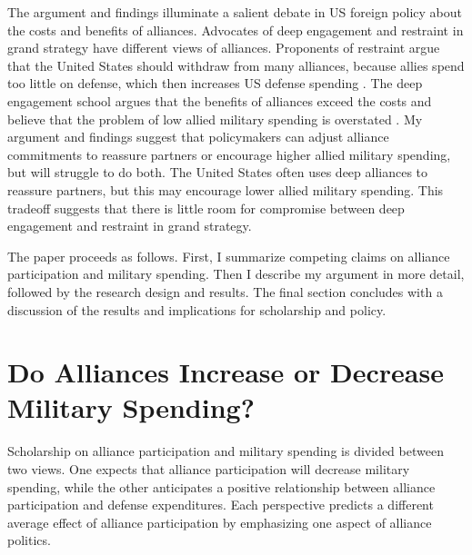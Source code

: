 \documentclass[12pt]{article}
\begin{document}
The argument and findings illuminate a salient debate in US foreign policy about the costs and benefits of alliances. 
Advocates of deep engagement \citep{Brooksetal2013} and restraint \citep{Posen2014} in grand strategy have different views of alliances. 
Proponents of restraint argue that the United States should withdraw from many alliances, because allies spend too little on defense, which then increases US defense spending \citep{Preble2009}.
The deep engagement school argues that the benefits of alliances exceed the costs and believe that the problem of low allied military spending is overstated \citep{BrandsFeaver2017}. 
My argument and findings suggest that policymakers can adjust alliance commitments to reassure partners or encourage higher allied military spending, but will struggle to do both. 
The United States often uses deep alliances to reassure partners, but this may encourage lower allied military spending. 
This tradeoff suggests that there is little room for compromise between deep engagement and restraint in grand strategy.  


The paper proceeds as follows. 
First, I summarize competing claims on alliance participation and military spending. 
Then I describe my argument in more detail, followed by the research design and results. 
The final section concludes with a discussion of the results and implications for scholarship and policy.  



\section{Do Alliances Increase or Decrease Military Spending?}


Scholarship on alliance participation and military spending is divided between two views.
One expects that alliance participation will decrease military spending, while the other anticipates a positive relationship between alliance participation and defense expenditures. 
Each perspective predicts a different average effect of alliance participation by emphasizing one aspect of alliance politics.   
\end{document}
